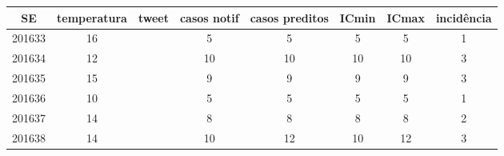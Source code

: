 \begin{tabular}{c|ccccccc}
  \hline
SE & temperatura & tweet & casos notif & casos preditos & ICmin & ICmax & incidência \\ 
  \hline
201633 & 16 &  & 5 & 5 & 5 & 5 & 1 \\ 
  201634 & 12 &  & 10 & 10 & 10 & 10 & 3 \\ 
  201635 & 15 &  & 9 & 9 & 9 & 9 & 3 \\ 
  201636 & 10 &  & 5 & 5 & 5 & 5 & 1 \\ 
  201637 & 14 &  & 8 & 8 & 8 & 8 & 2 \\ 
  201638 & 14 &  & 10 & 12 & 10 & 12 & 3 \\ 
   \hline
\end{tabular}

